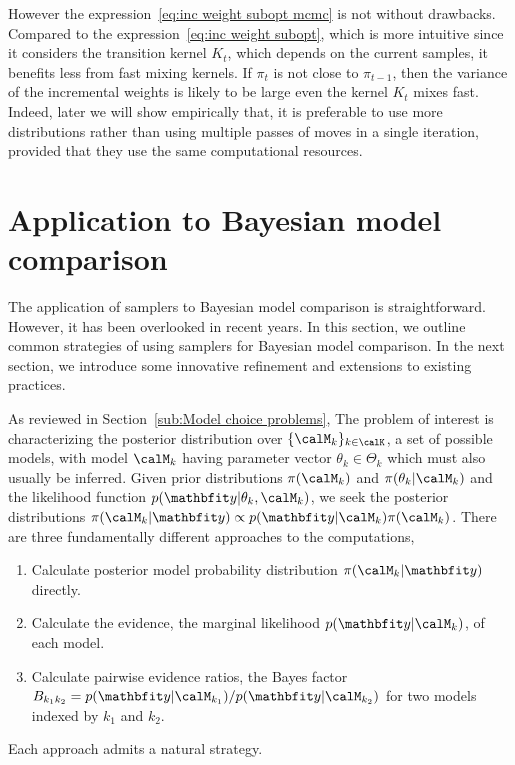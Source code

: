 However the expression~\eqref{eq:inc weight subopt mcmc} is not without
drawbacks. Compared to the expression~\eqref{eq:inc weight subopt}, which is
more intuitive since it considers the transition kernel $K_t$, which depends
on the current samples, it benefits less from fast mixing kernels. If $\pi_t$
is not close to $\pi_{t-1}$, then the variance of the incremental weights is
likely to be large even the kernel $K_t$ mixes fast. Indeed, later we will
show empirically that, it is preferable to use more distributions rather than
using multiple passes of \mcmc moves in a single iteration, provided that they
use the same computational resources.

\section{Application to Bayesian model comparison}
\label{sec:Application to Bayesian model comparison}

The application of \smc samplers to Bayesian model comparison is
straightforward. However, it has been overlooked in recent years. In this
section, we outline common strategies of using \smc samplers for Bayesian
model comparison. In the next section, we introduce some innovative refinement
and extensions to existing practices.

As reviewed in Section~\ref{sub:Model choice problems}, The problem of
interest is characterizing the posterior distribution over
$\{\calM_k\}_{k\in\calK}$, a set of possible models, with model $\calM_k$
having parameter vector $\theta_k\in\Theta_k$ which must also usually be
inferred. Given prior distributions $\pi(\calM_k)$ and $\pi(\theta_k|\calM_k)$
and the likelihood function $p(\data|\theta_k,\calM_k)$, we seek the posterior
distributions $\pi(\calM_k|\data)\propto p(\data|\calM_k)\pi(\calM_k)$. There
are three fundamentally different approaches to the computations,
\begin{enumerate}
  \item Calculate posterior model probability distribution
    $\pi(\calM_k|\data)$ directly.
  \item Calculate the evidence, the marginal likelihood $p(\data|\calM_k)$, of
    each model.
  \item Calculate pairwise evidence ratios, the Bayes factor $B_{k_1k_2} =
    p(\data|\calM_{k_1})/p(\data|\calM_{k_2})$ for two models indexed by $k_1$
    and $k_2$.
\end{enumerate}
Each approach admits a natural \smc strategy.

